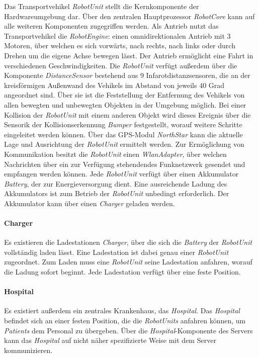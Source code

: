     Das Transportvehikel \emph{RobotUnit} stellt die Kernkomponente der Hardwareumgebung dar.
    Über den zentralen Hauptprozessor \emph{RobotCore} kann auf alle weiteren Komponenten zugegriffen werden.
    Als Antrieb nutzt das Transportvehikel die \emph{RobotEngine}: einen omnidirektionalen Antrieb mit 3 Motoren, über welchen es sich vorwärts, nach rechts, nach links oder durch Drehen um die eigene Achse bewegen lässt.
    Der Antrieb ermöglicht eine Fahrt in verschiedenen Geschwindigkeiten.
    Die \emph{RobotUnit} verfügt außerdem über die Komponente \emph{DistanceSensor} bestehend aus 9 Infarotdistanzsensoren, die an der kreisförmigen Außenwand des Vehikels im Abstand von jeweils 40 Grad angeordnet sind.
    Über sie ist die Feststellung der Entfernung des Vehikels von allen bewegten und unbewegten Objekten in der Umgebung möglich.
    Bei einer Kollision der \emph{RobotUnit} mit einem anderen Objekt wird dieses Ereignis über die Sensorik der Kollisionserkennung \emph{Bumper} festgestellt, worauf weitere Schritte eingeleitet werden können.
    Über das GPS-Modul \emph{NorthStar} kann die aktuelle Lage und Ausrichtung der \emph{RobotUnit} ermittelt werden.
    Zur Ermöglichung von Kommunikation besitzt die \emph{RobotUnit} einen \emph{WlanAdapter}, über welchen Nachrichten über ein zur Verfügung stehendendes Funknetzwerk gesendet und empfangen werden können.
    Jede \emph{RobotUnit} verfügt über einen Akkumulator \emph{Battery}, der zur Energieversorgung dient.
    Eine ausreichende Ladung des Akkumulators ist zum Betrieb der \emph{RobotUnit} unbedingt erforderlich.
    Der Akkumulator kann über einen \emph{Charger} geladen werden.

    \paragraph{Charger}\label{charger}

    Es existieren die Ladestationen \emph{Charger}, über die sich die \emph{Battery} der \emph{RobotUnit} vollständig laden lässt.
    Eine Ladestation ist dabei genau einer \emph{RobotUnit} zugeordnet.
    Zum Laden muss eine \emph{RobotUnit} seine Ladestation anfahren, worauf die Ladung sofort beginnt.
    Jede Ladestation verfügt über eine feste Position.

    \paragraph{Hospital}\label{hospital}

    Es existiert außerdem ein zentrales Krankenhaus, das \emph{Hospital}.
    Das \emph{Hospital} befindet sich an einer festen Position, die die \emph{RobotUnits} anfahren können, um \emph{Patients} dem Personal zu übergeben.
    Über die \emph{Hospital}-Komponente des Servers kann das \emph{Hospital} auf nicht näher spezifizierte Weise mit dem Server kommunizieren.

